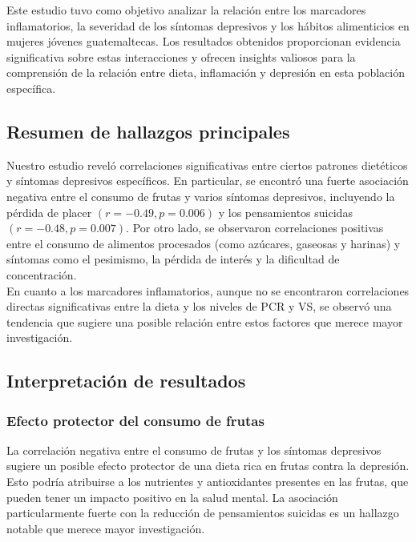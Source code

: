 \documentclass[man]{apa7}
\begin{document}
	Este estudio tuvo como objetivo analizar la relación entre los
	marcadores inflamatorios, la severidad de los síntomas depresivos y los
	hábitos alimenticios en mujeres jóvenes guatemaltecas. Los resultados
	obtenidos proporcionan evidencia significativa sobre estas interacciones
	y ofrecen insights valiosos para la comprensión de la relación entre
	dieta, inflamación y depresión en esta población específica.

	\subsection{Resumen de hallazgos principales}\label{resumen-de-hallazgos-principales}

	Nuestro estudio reveló correlaciones significativas entre ciertos
	patrones dietéticos y síntomas depresivos específicos. En particular, se
	encontró una fuerte asociación negativa entre el consumo de frutas y
	varios síntomas depresivos, incluyendo la pérdida de placer $(r = -0.49,
	p = 0.006)$ y los pensamientos suicidas $(r = -0.48, p = 0.007)$. Por otro
	lado, se observaron correlaciones positivas entre el consumo de
	alimentos procesados (como azúcares, gaseosas y harinas) y síntomas como
	el pesimismo, la pérdida de interés y la dificultad de concentración.\\

	En cuanto a los marcadores inflamatorios, aunque no se encontraron
	correlaciones directas significativas entre la dieta y los niveles de
	PCR y VS, se observó una tendencia que sugiere una posible relación
	entre estos factores que merece mayor investigación.


	\subsection{Interpretación de resultados}\label{interpretaciuxf3n-de-resultados}

	\subsubsection{Efecto protector del consumo de frutas}

	La correlación negativa entre el consumo de frutas y los síntomas
	depresivos sugiere un posible efecto protector de una dieta rica en
	frutas contra la depresión. Esto podría atribuirse a los nutrientes y
	antioxidantes presentes en las frutas, que pueden tener un impacto
	positivo en la salud mental. La asociación particularmente fuerte con la
	reducción de pensamientos suicidas es un hallazgo notable que merece
	mayor investigación.\\
\end{document}
